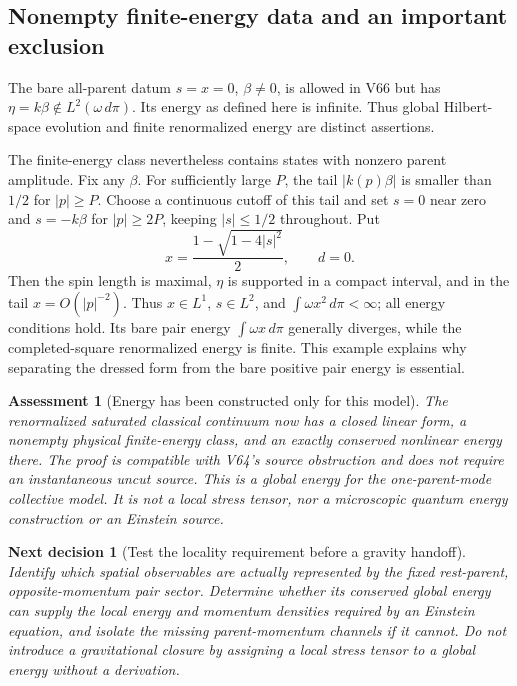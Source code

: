 \documentclass[11pt]{article}
\newtheorem{decision}[theorem]{Next decision}
\newtheorem{assessment}[theorem]{Assessment}
\theoremstyle{remark}
\begin{document}
\subsection{Nonempty finite-energy data and an important exclusion}

The bare all-parent datum \(s=x=0\), \(\beta\ne0\),
is allowed in V66 but has
\(\eta=k\beta\notin L^2(\omega\,d\pi)\).
Its energy as defined here is infinite.  Thus global
Hilbert-space evolution and finite renormalized energy
are distinct assertions.

The finite-energy class nevertheless contains states
with nonzero parent amplitude.  Fix any \(\beta\).
For sufficiently large \(P\), the tail
\(|k(p)\beta|\) is smaller than \(1/2\) for \(|p|\geq P\).
Choose a continuous cutoff of this tail and set \(s=0\)
near zero and \(s=-k\beta\) for \(|p|\geq2P\), keeping
\(|s|\leq1/2\) throughout.  Put
\[
 x=\frac{1-\sqrt{1-4|s|^2}}2,\qquad d=0.
\]
Then the spin length is maximal, \(\eta\) is supported
in a compact interval, and in the tail \(x=O(|p|^{-2})\).
Thus \(x\in L^1\), \(s\in L^2\), and
\(\int\omega x^2\,d\pi<\infty\); all energy conditions
hold.  Its bare pair energy \(\int\omega x\,d\pi\)
generally diverges, while the completed-square
renormalized energy is finite.  This example explains
why separating the dressed form from the bare
positive pair energy is essential.

\begin{assessment}[Energy has been constructed only for this model]
\label{ass:v20v67}
The renormalized saturated classical continuum now has
a closed linear form, a nonempty physical finite-energy
class, and an exactly conserved nonlinear energy there.
The proof is compatible with V64's source obstruction
and does not require an instantaneous uncut source.
This is a global energy for the one-parent-mode
collective model.  It is not a local stress tensor,
nor a microscopic quantum energy construction or an
Einstein source.
\end{assessment}

\begin{decision}[Test the locality requirement before a gravity handoff]
\label{dec:v20v67-next}
Identify which spatial observables are actually represented
by the fixed rest-parent, opposite-momentum pair sector.
Determine whether its conserved global energy can supply
the local energy and momentum densities required by an
Einstein equation, and isolate the missing parent-momentum
channels if it cannot.  Do not introduce a gravitational
closure by assigning a local stress tensor to a global
energy without a derivation.
\end{decision}
\end{document}
